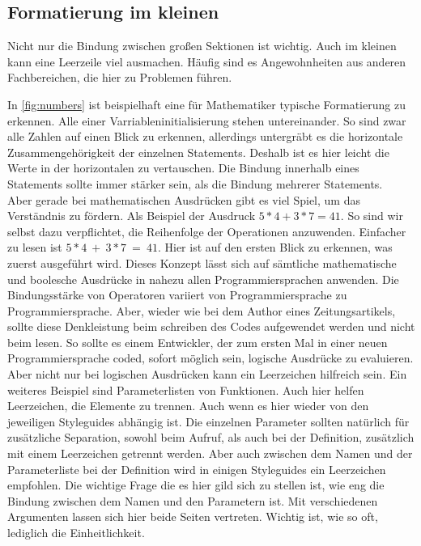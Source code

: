     \subsection{Formatierung im kleinen}
        Nicht nur die Bindung zwischen großen Sektionen ist wichtig.
        Auch im kleinen kann eine Leerzeile viel ausmachen.
        Häufig sind es Angewohnheiten aus anderen Fachbereichen, die hier zu Problemen führen.
        
        In \ref{fig:numbers} ist beispielhaft eine für Mathematiker typische Formatierung zu erkennen.
        Alle  einer Varriableninitialisierung stehen untereinander.
        So sind zwar alle Zahlen auf einen Blick zu erkennen, allerdings untergräbt es die horizontale Zusammengehörigkeit der einzelnen Statements.
        Deshalb ist es hier leicht die Werte in der horizontalen zu vertauschen.
        Die Bindung innerhalb eines Statements sollte immer stärker sein, als die Bindung mehrerer Statements.\\
        Aber gerade bei mathematischen Ausdrücken gibt es viel Spiel, um das Verständnis zu fördern.
        Als Beispiel der Ausdruck $5*4+3*7=41$.
        So sind wir selbst dazu verpflichtet, die Reihenfolge der Operationen anzuwenden.
        Einfacher zu lesen ist $5*4\ +\ 3*7\ =\ 41$.
        Hier ist auf den ersten Blick zu erkennen, was zuerst ausgeführt wird.
        Dieses Konzept lässt sich auf sämtliche mathematische und boolesche Ausdrücke in nahezu allen Programmiersprachen anwenden.
        Die Bindungsstärke von Operatoren variiert von Programmiersprache zu Programmiersprache.
        Aber, wieder wie bei dem Author eines Zeitungsartikels, sollte diese Denkleistung beim schreiben des Codes aufgewendet werden und nicht beim lesen.
        So sollte es einem Entwickler, der zum ersten Mal in einer neuen Programmiersprache coded, sofort möglich sein, logische Ausdrücke zu evaluieren.\\
        Aber nicht nur bei logischen Ausdrücken kann ein Leerzeichen hilfreich sein.
        Ein weiteres Beispiel sind Parameterlisten von Funktionen.
        Auch hier helfen Leerzeichen, die Elemente zu trennen.
        Auch wenn es hier wieder von den jeweiligen Styleguides abhängig ist.
        Die einzelnen Parameter sollten  natürlich für zusätzliche Separation, sowohl beim Aufruf, als auch bei der Definition, zusätzlich mit einem Leerzeichen getrennt werden.
        Aber auch zwischen dem Namen und der Parameterliste bei der Definition wird in einigen Styleguides ein Leerzeichen empfohlen.
        Die wichtige Frage die es hier gild sich zu stellen ist, wie eng die Bindung zwischen dem Namen und den Parametern ist.
        Mit verschiedenen Argumenten lassen sich hier beide Seiten vertreten.
        Wichtig ist, wie so oft, lediglich die Einheitlichkeit.
